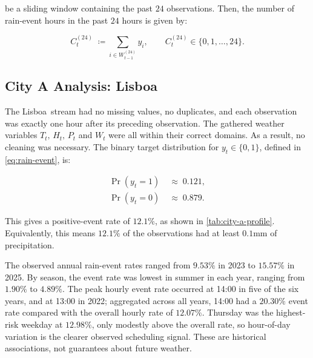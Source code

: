 \documentclass[11pt,a4paper]{article}
\newcommand{\CityA}{Lisboa}
\newif\ifdraftinstructions
\newcommand{\instruction}[1]{%
	\ifdraftinstructions
	\begin{instructionbox}[title=What to write here]
		\small\color{SecondaryText}#1
	\end{instructionbox}
	\fi
}
\begin{document}
	be a sliding window containing the past $24$ observations. Then, the number of rain-event hours in the past $24$ hours is given by:
	
	\begin{equation}
		\label{eq:C_t^(24)}
		C^{(24)}_t \;\coloneqq \sum_{i \in W^{(24)}_{t-1}} y_i, \qquad C^{(24)}_t \in \{0, 1, \dotsc, 24\}.
	\end{equation}
	
	\subsection{City A Analysis: \CityA}
	\instruction{This section is primarily the responsibility of Student A. Characterise the stream for City A before interpreting the models. Include data quality observations, descriptive statistics, target class distribution, temporal behaviour, rolling/window evidence, and at least one analysis that is relevant to the assigned business context. Explain what the evidence means; do not simply describe the shape of a chart. Suggested length: about one page.}
	
	The \CityA\ stream had no missing values, no duplicates, and each observation was exactly one hour after its preceding observation. The gathered weather variables $T_t,\,H_t,\,P_t$ and $W_t$ were all within their correct domains. As a result, no cleaning was necessary. The binary target distribution for $y_t \in \{0,1\}$, defined in \autoref{eq:rain-event}, is:
	
	\begin{align}
		\Pr(y_t = 1) \;&\approx\; 0.121, \\
		\Pr(y_t = 0) \;&\approx\; 0.879.
	\end{align}

	This gives a positive-event rate of $12.1\%$, as shown in \autoref{tab:city-a-profile}. Equivalently, this means $12.1\%$ of the observations had at least $0.1\mathrm{mm}$ of precipitation.
	
	The observed annual rain-event rates ranged from $9.53\%$ in 2023 to $15.57\%$ in 2025. By season, the event rate was lowest in summer in each year, ranging from $1.90\%$ to $4.89\%$. The peak hourly event rate occurred at 14:00 in five of the six years, and at 13:00 in 2022; aggregated across all years, 14:00 had a $20.30\%$ event rate compared with the overall hourly rate of $12.07\%$. Thursday was the highest-risk weekday at $12.98\%$, only modestly above the overall rate, so hour-of-day variation is the clearer observed scheduling signal. These are historical associations, not guarantees about future weather.
\end{document}
